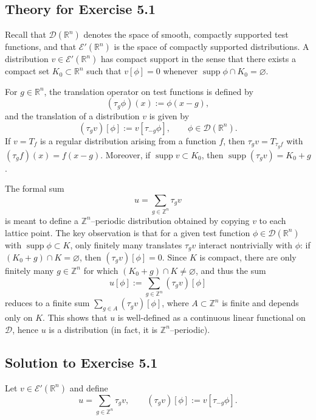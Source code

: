 \documentclass[12pt,a4paper]{article}
\theoremstyle{plain}
\theoremstyle{definition}
\theoremstyle{remark}
\theoremstyle{remark}
\begin{document}
\subsection*{Theory for Exercise 5.1}

Recall that $\mathcal{D}(\mathbb{R}^n)$ denotes the space of smooth,
compactly supported test functions, and that
$\mathcal{E}'(\mathbb{R}^n)$ is the space of compactly supported
distributions.  A distribution $v\in\mathcal{E}'(\mathbb{R}^n)$ has
compact support in the sense that there exists a compact set
$K_0\subset\mathbb{R}^n$ such that $v[\phi]=0$ whenever
$\operatorname{supp}\phi\cap K_0=\varnothing$.

For $g\in\mathbb{R}^n$, the translation operator on test functions is
defined by
\[
(\tau_g\phi)(x) := \phi(x-g),
\]
and the translation of a distribution $v$ is given by
\[
(\tau_g v)[\phi] := v[\tau_{-g}\phi],\qquad \phi\in\mathcal{D}(\mathbb{R}^n).
\]
If $v=T_f$ is a regular distribution arising from a function $f$, then
$\tau_g v = T_{\tau_g f}$ with $(\tau_g f)(x)=f(x-g)$.  Moreover,
if $\operatorname{supp}v\subset K_0$, then
$\operatorname{supp}(\tau_g v) = K_0 + g$.

The formal sum
\[
u = \sum_{g\in\mathbb{Z}^n} \tau_g v
\]
is meant to define a $\mathbb{Z}^n$--periodic distribution obtained by
copying $v$ to each lattice point.  The key observation is that for a
given test function $\phi\in\mathcal{D}(\mathbb{R}^n)$ with
$\operatorname{supp}\phi\subset K$, only finitely many translates
$\tau_g v$ interact nontrivially with $\phi$: if
$(K_0+g)\cap K=\varnothing$, then $(\tau_g v)[\phi]=0$.  Since $K$ is
compact, there are only finitely many $g\in\mathbb{Z}^n$ for which
$(K_0+g)\cap K\neq\varnothing$, and thus the sum
\[
u[\phi] := \sum_{g\in\mathbb{Z}^n} (\tau_g v)[\phi]
\]
reduces to a finite sum $\sum_{g\in A} (\tau_g v)[\phi]$, where
$A\subset\mathbb{Z}^n$ is finite and depends only on $K$.  This shows that
$u$ is well-defined as a continuous linear functional on $\mathcal{D}$,
hence $u$ is a distribution (in fact, it is $\mathbb{Z}^n$--periodic).

\bigskip

\subsection*{Solution to Exercise 5.1}

Let $v\in\mathcal{E}'(\mathbb{R}^n)$ and define
\[
u = \sum_{g\in\mathbb{Z}^n} \tau_g v,
\qquad
(\tau_g v)[\phi] := v[\tau_{-g}\phi].
\]
\end{document}
